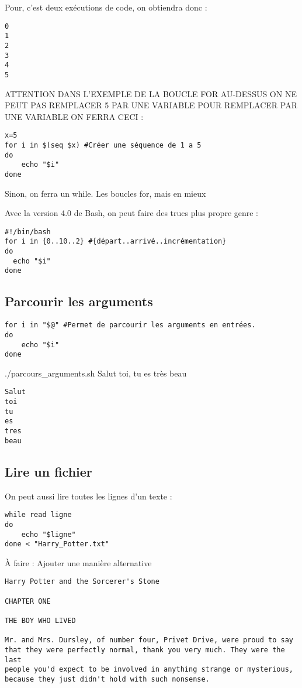 \documentclass{article}
\begin{document}
Pour, c'est deux exécutions de code, on obtiendra donc :

\begin{lstlisting}
0
1
2
3
4
5
\end{lstlisting}

ATTENTION DANS L'EXEMPLE DE LA BOUCLE FOR AU-DESSUS ON NE PEUT PAS REMPLACER 5 PAR UNE VARIABLE POUR REMPLACER PAR UNE VARIABLE ON FERRA CECI :

\begin{verbatim}
x=5
for i in $(seq $x) #Créer une séquence de 1 a 5
do
    echo "$i"
done
\end{verbatim}

Sinon, on ferra un while.
Les boucles for, mais en mieux

Avec la version 4.0 de Bash, on peut faire des trucs plus propre genre :

\begin{verbatim}
#!/bin/bash
for i in {0..10..2} #{départ..arrivé..incrémentation}
do
  echo "$i"
done
\end{verbatim}

\subsection{Parcourir les arguments}

\begin{verbatim}
for i in "$@" #Permet de parcourir les arguments en entrées.
do
    echo "$i"
done
\end{verbatim}

./parcours\_arguments.sh Salut toi, tu es très beau

\begin{lstlisting}
Salut
toi
tu
es
tres
beau
\end{lstlisting}

\subsection{Lire un fichier}

On peut aussi lire toutes les lignes d'un texte :

\begin{verbatim}
while read ligne
do
    echo "$ligne"
done < "Harry_Potter.txt"
\end{verbatim}

À faire : Ajouter une manière alternative

\begin{lstlisting}
Harry Potter and the Sorcerer's Stone

CHAPTER ONE

THE BOY WHO LIVED

Mr. and Mrs. Dursley, of number four, Privet Drive, were proud to say
that they were perfectly normal, thank you very much. They were the last
people you'd expect to be involved in anything strange or mysterious,
because they just didn't hold with such nonsense.
\end{lstlisting}
\end{document}
